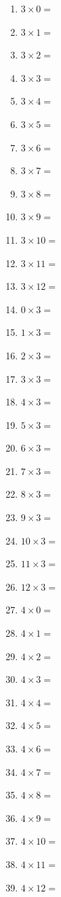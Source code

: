 \documentclass{article}
\begin{document}
\begin{multicols}{4}
\begin{enumerate}
\item $3 \times 0 =$
\item $3 \times 1 =$
\item $3 \times 2 =$
\item $3 \times 3 =$
\item $3 \times 4 =$
\item $3 \times 5 =$
\item $3 \times 6 =$
\item $3 \times 7 =$
\item $3 \times 8 =$
\item $3 \times 9 =$
\item $3 \times 10 =$
\item $3 \times 11 =$
\item $3 \times 12 =$

\item $0 \times 3 =$
\item $1 \times 3 =$
\item $2 \times 3 =$
\item $3 \times 3 =$
\item $4 \times 3 =$
\item $5 \times 3 =$
\item $6 \times 3 =$
\item $7 \times 3 =$
\item $8 \times 3 =$
\item $9 \times 3 =$
\item $10 \times 3 =$
\item $11 \times 3 =$
\item $12 \times 3 =$

\item $4 \times 0 =$
\item $4 \times 1 =$
\item $4 \times 2 =$
\item $4 \times 3 =$
\item $4 \times 4 =$
\item $4 \times 5 =$
\item $4 \times 6 =$
\item $4 \times 7 =$
\item $4 \times 8 =$
\item $4 \times 9 =$
\item $4 \times 10 =$
\item $4 \times 11 =$
\item $4 \times 12 =$


\end{enumerate}
\end{multicols}
\end{document}
